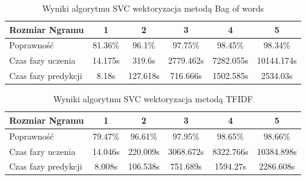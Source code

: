 \begin{table}[H]
    \centering
    \caption{Wyniki algorytmu Naive Bayes wektoryzacja metodą TFIDF}
\end{table}

\begin{table}[H]
    \centering
    \caption{Wyniki algorytmu SVC wektoryzacja metodą Bag of words}
    \begin{tabular}{ | l | c | c | c | c | c |}
        \hline
        Rozmiar Ngramu & 1 & 2 & 3 & 4 & 5 \\ \hline
        Poprawność & 81.36\% & 96.1\% & 97.75\% & 98.45\% & 98.34\%   \\ \hline
        Czas fazy uczenia & 14.175s & 319.6s & 2779.462s & 7282.055s & 10144.174s  \\ \hline
        Czas fazy predykcji & 8.18s & 127.618s & 716.666s & 1502.585s & 2534.03s  \\ \hline
    \end{tabular}
\end{table}

\begin{table}[H]
    \centering
    \caption{Wyniki algorytmu SVC wektoryzacja metodą TFIDF}
    \begin{tabular}{ | l | c | c | c | c | c |}
        \hline
        Rozmiar Ngramu & 1 & 2 & 3 & 4 & 5   \\ \hline
        Poprawność & 79.47\% & 96.61\% & 97.95\% & 98.65\% & 98.66\% \\ \hline
        Czas fazy uczenia & 14.046s & 220.009s & 3068.672s & 8322.766s & 10384.898s \\ \hline
        Czas fazy predykcji & 8.008s & 106.538s & 751.689s & 1594.27s & 2286.608s  \\ \hline
    \end{tabular}
\end{table}

